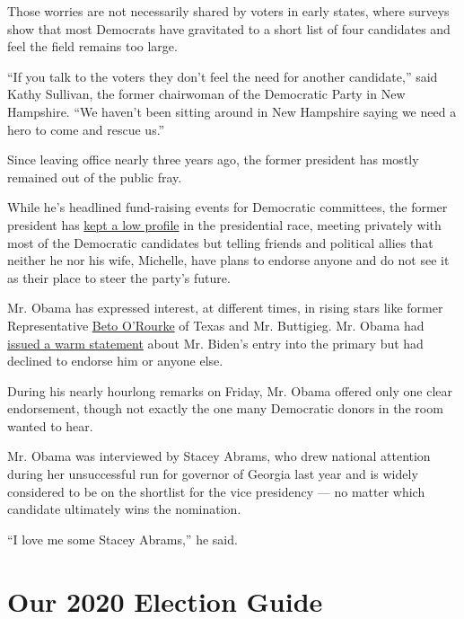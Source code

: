 Those worries are not necessarily shared by voters in early states,
where surveys show that most Democrats have gravitated to a short list
of four candidates and feel the field remains too large.

``If you talk to the voters they don't feel the need for another
candidate,'' said Kathy Sullivan, the former chairwoman of the
Democratic Party in New Hampshire. ``We haven't been sitting around in
New Hampshire saying we need a hero to come and rescue us.''

Since leaving office nearly three years ago, the former president has
mostly remained out of the public fray.

While he's headlined fund-raising events for Democratic committees, the
former president has
\href{https://www.nytimes3xbfgragh.onion/2019/02/18/us/politics/obama-2020-democratic-candidates.html?module=inline}{kept
a low profile} in the presidential race, meeting privately with most of
the Democratic candidates but telling friends and political allies that
neither he nor his wife, Michelle, have plans to endorse anyone and do
not see it as their place to steer the party's future.

Mr. Obama has expressed interest, at different times, in rising stars
like former Representative
\href{https://www.nytimes3xbfgragh.onion/interactive/2020/us/elections/beto-orourke.html}{Beto
O'Rourke} of Texas and Mr. Buttigieg. Mr. Obama had
\href{https://www.nytimes3xbfgragh.onion/2019/04/25/us/politics/joe-biden-2020-announcement.html?module=inline}{issued
a warm statement} about Mr. Biden's entry into the primary but had
declined to endorse him or anyone else.

During his nearly hourlong remarks on Friday, Mr. Obama offered only one
clear endorsement, though not exactly the one many Democratic donors in
the room wanted to hear.

Mr. Obama was interviewed by Stacey Abrams, who drew national attention
during her unsuccessful run for governor of Georgia last year and is
widely considered to be on the shortlist for the vice presidency --- no
matter which candidate ultimately wins the nomination.

``I love me some Stacey Abrams,'' he said.

\hypertarget{our-2020-election-guide}{%
\section{Our 2020 Election Guide}\label{our-2020-election-guide}}

